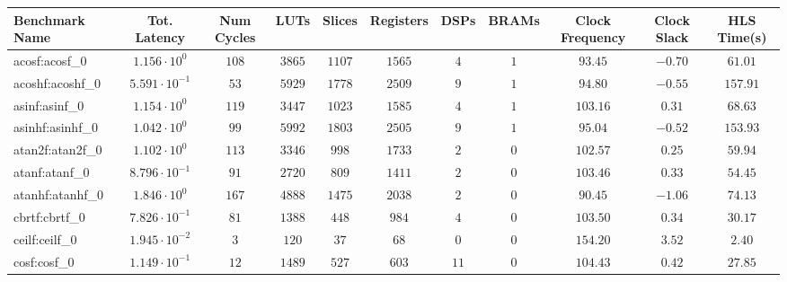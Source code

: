 \begin{tabular}{|l|c|c|c|c|c|c|c|c|c|c|}
\hline
Benchmark Name               & Tot. Latency            & Num Cycles & LUTs      & Slices    & Registers & DSPs    & BRAMs & Clock Frequency & Clock Slack & HLS Time(s) \\
\hline
acosf:acosf\_0               & $ 1.156 \cdot 10^{0}  $ & $ 108    $ & $ 3865  $ & $ 1107  $ & $ 1565  $ & $ 4   $ & $ 1 $ & $ 93.45       $ & $ -0.70   $ & $ 61.01   $ \\
acoshf:acoshf\_0             & $ 5.591 \cdot 10^{-1} $ & $ 53     $ & $ 5929  $ & $ 1778  $ & $ 2509  $ & $ 9   $ & $ 1 $ & $ 94.80       $ & $ -0.55   $ & $ 157.91  $ \\
asinf:asinf\_0               & $ 1.154 \cdot 10^{0}  $ & $ 119    $ & $ 3447  $ & $ 1023  $ & $ 1585  $ & $ 4   $ & $ 1 $ & $ 103.16      $ & $ 0.31    $ & $ 68.63   $ \\
asinhf:asinhf\_0             & $ 1.042 \cdot 10^{0}  $ & $ 99     $ & $ 5992  $ & $ 1803  $ & $ 2505  $ & $ 9   $ & $ 1 $ & $ 95.04       $ & $ -0.52   $ & $ 153.93  $ \\
atan2f:atan2f\_0             & $ 1.102 \cdot 10^{0}  $ & $ 113    $ & $ 3346  $ & $ 998   $ & $ 1733  $ & $ 2   $ & $ 0 $ & $ 102.57      $ & $ 0.25    $ & $ 59.94   $ \\
atanf:atanf\_0               & $ 8.796 \cdot 10^{-1} $ & $ 91     $ & $ 2720  $ & $ 809   $ & $ 1411  $ & $ 2   $ & $ 0 $ & $ 103.46      $ & $ 0.33    $ & $ 54.45   $ \\
atanhf:atanhf\_0             & $ 1.846 \cdot 10^{0}  $ & $ 167    $ & $ 4888  $ & $ 1475  $ & $ 2038  $ & $ 2   $ & $ 0 $ & $ 90.45       $ & $ -1.06   $ & $ 74.13   $ \\
cbrtf:cbrtf\_0               & $ 7.826 \cdot 10^{-1} $ & $ 81     $ & $ 1388  $ & $ 448   $ & $ 984   $ & $ 4   $ & $ 0 $ & $ 103.50      $ & $ 0.34    $ & $ 30.17   $ \\
ceilf:ceilf\_0               & $ 1.945 \cdot 10^{-2} $ & $ 3      $ & $ 120   $ & $ 37    $ & $ 68    $ & $ 0   $ & $ 0 $ & $ 154.20      $ & $ 3.52    $ & $ 2.40    $ \\
cosf:cosf\_0                 & $ 1.149 \cdot 10^{-1} $ & $ 12     $ & $ 1489  $ & $ 527   $ & $ 603   $ & $ 11  $ & $ 0 $ & $ 104.43      $ & $ 0.42    $ & $ 27.85   $ \\

\end{tabular}
